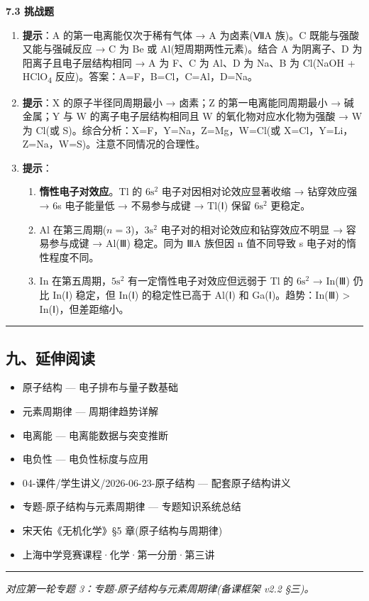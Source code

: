 \textbf{7.3 挑战题}

\begin{enumerate}
\def\labelenumi{\arabic{enumi}.}
\setcounter{enumi}{6}
\item
  \textbf{提示}：A 的第一电离能仅次于稀有气体 → A 为卤素(ⅦA 族)。C 既能与强酸又能与强碱反应 → C 为 Be 或 Al(短周期两性元素)。结合 A 为阴离子、D 为阳离子且电子层结构相同 → A 为 F、C 为 Al、D 为 Na、B 为 Cl(NaOH + HClO\textsubscript{4} 反应)。答案：A=F，B=Cl，C=Al，D=Na。
\item
  \textbf{提示}：X 的原子半径同周期最小 → 卤素；Z 的第一电离能同周期最小 → 碱金属；Y 与 W 的离子电子层结构相同且 W 的氧化物对应水化物为强酸 → W 为 Cl(或 S)。综合分析：X=F，Y=Na，Z=Mg，W=Cl(或 X=Cl，Y=Li，Z=Na，W=S)。注意不同情况的合理性。
\item
  \textbf{提示}：

  \begin{enumerate}
  \def\labelenumii{(\arabic{enumii})}
  \tightlist
  \item
    \textbf{惰性电子对效应}。Tl 的 \(6\mathrm{s}^2\) 电子对因相对论效应显著收缩 → 钻穿效应强 → 6s 电子能量低 → 不易参与成键 → Tl(Ⅰ) 保留 \(6\mathrm{s}^2\) 更稳定。
  \item
    Al 在第三周期(\(n=3\))，\(3\mathrm{s}^2\) 电子对的相对论效应和钻穿效应不明显 → 容易参与成键 → Al(Ⅲ) 稳定。同为 ⅢA 族但因 n 值不同导致 s 电子对的惰性程度不同。
  \item
    In 在第五周期，\(5\mathrm{s}^2\) 有一定惰性电子对效应但远弱于 Tl 的 \(6\mathrm{s}^2\) → In(Ⅲ) 仍比 In(Ⅰ) 稳定，但 In(Ⅰ) 的稳定性已高于 Al(Ⅰ) 和 Ga(Ⅰ)。趋势：In(Ⅲ) \textgreater{} In(Ⅰ)，但差距缩小。
  \end{enumerate}
\end{enumerate}

\begin{center}\rule{0.5\linewidth}{0.5pt}\end{center}

\subsection{九、延伸阅读}\label{ux4e5dux5ef6ux4f38ux9605ux8bfb}

\begin{itemize}
\tightlist
\item
  原子结构 --- 电子排布与量子数基础
\item
  元素周期律 --- 周期律趋势详解
\item
  电离能 --- 电离能数据与突变推断
\item
  电负性 --- 电负性标度与应用
\item
  04-课件/学生讲义/2026-06-23-原子结构 --- 配套原子结构讲义
\item
  专题-原子结构与元素周期律 --- 专题知识系统总结
\item
  宋天佑《无机化学》§5 章(原子结构与周期律)
\item
  上海中学竞赛课程·化学·第一分册·第三讲
\end{itemize}

\begin{center}\rule{0.5\linewidth}{0.5pt}\end{center}

\emph{对应第一轮专题 3：专题-原子结构与元素周期律(备课框架 v2.2 §三)。}
